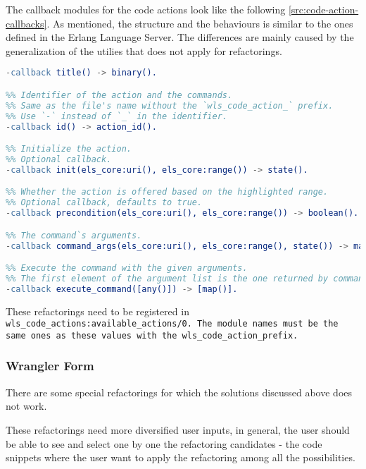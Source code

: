 The callback modules for the code actions look like the following \ref{src:code-action-callbacks}. As mentioned, the structure and the behaviours is similar to the ones defined in the Erlang Language Server. The differences are mainly caused by the generalization of the utilies that does not apply for refactorings.

\begin{lstlisting}[language=erlang]
%% Title which is shown to the user.
-callback title() -> binary().

%% Identifier of the action and the commands. 
%% Same as the file's name without the `wls_code_action_` prefix.
%% Use `-` instead of `_` in the identifier.
-callback id() -> action_id().

%% Initialize the action. 
%% Optional callback.
-callback init(els_core:uri(), els_core:range()) -> state().

%% Whether the action is offered based on the highlighted range. 
%% Optional callback, defaults to true.
-callback precondition(els_core:uri(), els_core:range()) -> boolean().

%% The command`s arguments.
-callback command_args(els_core:uri(), els_core:range(), state()) -> map().

%% Execute the command with the given arguments. 
%% The first element of the argument list is the one returned by command_args. 
-callback execute_command([any()]) -> [map()].
\end{lstlisting}

These refactorings need to be registered in \tt wls\_code\_actions:available\_actions/0\rm . 
The module names must be the same ones as these values with the \tt wls\_code\_action\_\rm prefix.




\subsubsection{Wrangler Form}
\label{src:wrangler-forms}

There are some special refactorings for which the solutions discussed above does not work.

These refactorings need more diversified user inputs, in general, the user should be able to see and select one by one the refactoring candidates - the code snippets where the user want to apply the refactoring among all the possibilities.

